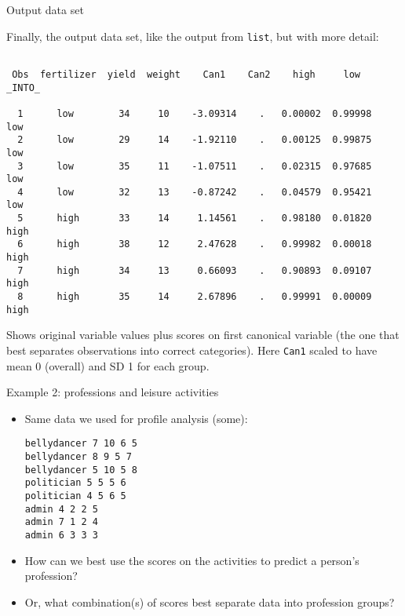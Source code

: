 \documentclass[pdf]{prosper}
\begin{document}
\begin{slide}{Output data set}

Finally, the output data set, like the output from \verb-list-, but with more detail:

{\scriptsize
\begin{verbatim}

 Obs  fertilizer  yield  weight    Can1    Can2    high     low    _INTO_

  1      low        34     10    -3.09314    .   0.00002  0.99998   low  
  2      low        29     14    -1.92110    .   0.00125  0.99875   low  
  3      low        35     11    -1.07511    .   0.02315  0.97685   low  
  4      low        32     13    -0.87242    .   0.04579  0.95421   low  
  5      high       33     14     1.14561    .   0.98180  0.01820   high 
  6      high       38     12     2.47628    .   0.99982  0.00018   high 
  7      high       34     13     0.66093    .   0.90893  0.09107   high 
  8      high       35     14     2.67896    .   0.99991  0.00009   high 

\end{verbatim}
}

Shows original variable values plus scores on first canonical variable (the one that best separates observations into correct categories). Here \verb-Can1- scaled to have mean 0 (overall) and SD 1 for each group.

  
\end{slide}

\begin{slide}{Example 2: professions and leisure activities}

  \begin{itemize}
  \item Same data we used for profile analysis (some):

\begin{verbatim}
bellydancer 7 10 6 5
bellydancer 8 9 5 7
bellydancer 5 10 5 8
politician 5 5 5 6
politician 4 5 6 5
admin 4 2 2 5
admin 7 1 2 4
admin 6 3 3 3

\end{verbatim}
  \item How can we best use the scores on the activities to predict a person's profession?
  \item Or, what combination(s) of scores best separate data into profession groups?
  \end{itemize}

\end{slide}
\end{document}

